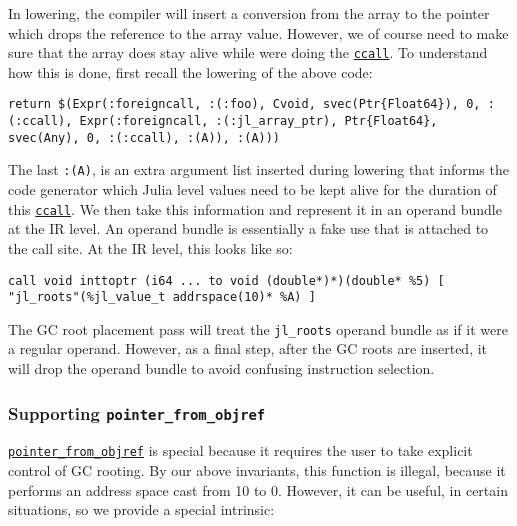 In lowering, the compiler will insert a conversion from the array to the pointer which drops the reference to the array value. However, we of course need to make sure that the array does stay alive while we{\textquotesingle}re doing the \hyperlink{14245046751182637566}{\texttt{ccall}}. To understand how this is done, first recall the lowering of the above code:




\begin{verbatim}
return $(Expr(:foreigncall, :(:foo), Cvoid, svec(Ptr{Float64}), 0, :(:ccall), Expr(:foreigncall, :(:jl_array_ptr), Ptr{Float64}, svec(Any), 0, :(:ccall), :(A)), :(A)))
\end{verbatim}



The last \texttt{:(A)}, is an extra argument list inserted during lowering that informs the code generator which Julia level values need to be kept alive for the duration of this \hyperlink{14245046751182637566}{\texttt{ccall}}. We then take this information and represent it in an {\textquotedbl}operand bundle{\textquotedbl} at the IR level. An operand bundle is essentially a fake use that is attached to the call site. At the IR level, this looks like so:




\begin{lstlisting}
call void inttoptr (i64 ... to void (double*)*)(double* %5) [ "jl_roots"(%jl_value_t addrspace(10)* %A) ]
\end{lstlisting}



The GC root placement pass will treat the \texttt{jl\_roots} operand bundle as if it were a regular operand. However, as a final step, after the GC roots are inserted, it will drop the operand bundle to avoid confusing instruction selection.



\hypertarget{9100387688336588039}{}


\subsubsection{Supporting \texttt{pointer\_from\_objref}}



\hyperlink{9366554937543398846}{\texttt{pointer\_from\_objref}} is special because it requires the user to take explicit control of GC rooting. By our above invariants, this function is illegal, because it performs an address space cast from 10 to 0. However, it can be useful, in certain situations, so we provide a special intrinsic:




